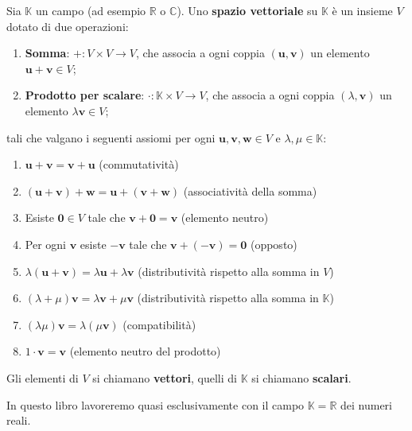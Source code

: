 \begin{definitionbox}
Sia $\mathbb{K}$ un campo (ad esempio $\mathbb{R}$ o $\mathbb{C}$). Uno \textbf{spazio vettoriale} su $\mathbb{K}$ è un insieme $V$ dotato di due operazioni:
\begin{enumerate}
    \item \textbf{Somma}: $+ \colon V \times V \to V$, che associa a ogni coppia $(\mathbf{u}, \mathbf{v})$ un elemento $\mathbf{u} + \mathbf{v} \in V$;
    \item \textbf{Prodotto per scalare}: $\cdot \colon \mathbb{K} \times V \to V$, che associa a ogni coppia $(\lambda, \mathbf{v})$ un elemento $\lambda \mathbf{v} \in V$;
\end{enumerate}
tali che valgano i seguenti assiomi per ogni $\mathbf{u}, \mathbf{v}, \mathbf{w} \in V$ e $\lambda, \mu \in \mathbb{K}$:
\begin{enumerate}
    \item $\mathbf{u} + \mathbf{v} = \mathbf{v} + \mathbf{u}$ \hfill (commutatività)
    \item $(\mathbf{u} + \mathbf{v}) + \mathbf{w} = \mathbf{u} + (\mathbf{v} + \mathbf{w})$ \hfill (associatività della somma)
    \item Esiste $\mathbf{0} \in V$ tale che $\mathbf{v} + \mathbf{0} = \mathbf{v}$ \hfill (elemento neutro)
    \item Per ogni $\mathbf{v}$ esiste $-\mathbf{v}$ tale che $\mathbf{v} + (-\mathbf{v}) = \mathbf{0}$ \hfill (opposto)
    \item $\lambda(\mathbf{u} + \mathbf{v}) = \lambda\mathbf{u} + \lambda\mathbf{v}$ \hfill (distributività rispetto alla somma in $V$)
    \item $(\lambda + \mu)\mathbf{v} = \lambda\mathbf{v} + \mu\mathbf{v}$ \hfill (distributività rispetto alla somma in $\mathbb{K}$)
    \item $(\lambda\mu)\mathbf{v} = \lambda(\mu\mathbf{v})$ \hfill (compatibilità)
    \item $1 \cdot \mathbf{v} = \mathbf{v}$ \hfill (elemento neutro del prodotto)
\end{enumerate}
Gli elementi di $V$ si chiamano \textbf{vettori}, quelli di $\mathbb{K}$ si chiamano \textbf{scalari}.
\end{definitionbox}

In questo libro lavoreremo quasi esclusivamente con il campo $\mathbb{K} = \mathbb{R}$ dei numeri reali.

